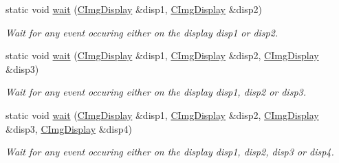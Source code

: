 \begin{DoxyCompactItemize}
\mbox{\label{structcimg__library__suffixed_1_1CImgDisplay_ace24e8dba61f452f643ac5423c1e8425}} 
static void \hyperlink{structcimg__library__suffixed_1_1CImgDisplay_ace24e8dba61f452f643ac5423c1e8425}{wait} (\hyperlink{structcimg__library__suffixed_1_1CImgDisplay}{C\+Img\+Display} \&disp1, \hyperlink{structcimg__library__suffixed_1_1CImgDisplay}{C\+Img\+Display} \&disp2)
\begin{DoxyCompactList}\small\item\em Wait for any event occuring either on the display {\ttfamily disp1} or {\ttfamily disp2}. \end{DoxyCompactList}\item 
\mbox{\label{structcimg__library__suffixed_1_1CImgDisplay_a72a1c47f139de64e5b5b7f60389d8c87}} 
static void \hyperlink{structcimg__library__suffixed_1_1CImgDisplay_a72a1c47f139de64e5b5b7f60389d8c87}{wait} (\hyperlink{structcimg__library__suffixed_1_1CImgDisplay}{C\+Img\+Display} \&disp1, \hyperlink{structcimg__library__suffixed_1_1CImgDisplay}{C\+Img\+Display} \&disp2, \hyperlink{structcimg__library__suffixed_1_1CImgDisplay}{C\+Img\+Display} \&disp3)
\begin{DoxyCompactList}\small\item\em Wait for any event occuring either on the display {\ttfamily disp1}, {\ttfamily disp2} or {\ttfamily disp3}. \end{DoxyCompactList}\item 
\mbox{\label{structcimg__library__suffixed_1_1CImgDisplay_a7a51030501ad4afce71084c235a81af9}} 
static void \hyperlink{structcimg__library__suffixed_1_1CImgDisplay_a7a51030501ad4afce71084c235a81af9}{wait} (\hyperlink{structcimg__library__suffixed_1_1CImgDisplay}{C\+Img\+Display} \&disp1, \hyperlink{structcimg__library__suffixed_1_1CImgDisplay}{C\+Img\+Display} \&disp2, \hyperlink{structcimg__library__suffixed_1_1CImgDisplay}{C\+Img\+Display} \&disp3, \hyperlink{structcimg__library__suffixed_1_1CImgDisplay}{C\+Img\+Display} \&disp4)
\begin{DoxyCompactList}\small\item\em Wait for any event occuring either on the display {\ttfamily disp1}, {\ttfamily disp2}, {\ttfamily disp3} or {\ttfamily disp4}. \end{DoxyCompactList}\item 

\end{DoxyCompactItemize}
